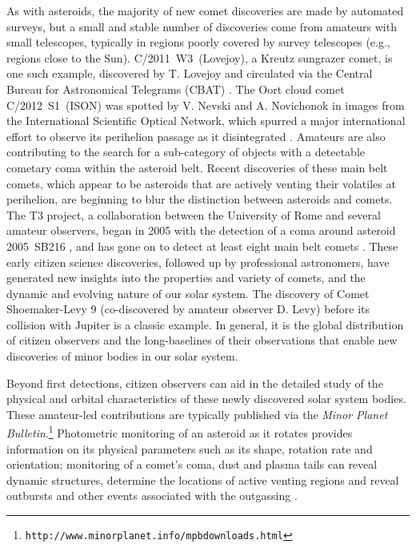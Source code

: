 \documentclass{ar2e}
\def\url#1{\texttt{#1}}
\begin{document}
As with asteroids, the majority of new comet discoveries are made by automated
surveys, but a small and stable number of discoveries come from amateurs with
small telescopes, typically in regions poorly covered by survey telescopes
(e.g., regions close to the Sun).   C/2011~W3~(Lovejoy), a Kreutz sungrazer
comet, is one such example, discovered by T. Lovejoy and circulated via the
Central Bureau for Astronomical Telegrams (CBAT) \citep[e.g.,][]{12sekanina}. 
The Oort cloud comet C/2012~S1~(ISON) was spotted by V. Nevski and A. Novichonok
in images from the International Scientific Optical Network, which spurred a
major international effort to observe its perihelion passage as it disintegrated
\citep{14sekanina}.  Amateurs are also contributing to the search for a
sub-category of objects with a detectable cometary coma within the asteroid
belt.  Recent discoveries of these main belt comets, which appear to be
asteroids that are actively venting their volatiles at perihelion, are beginning
to blur the distinction between asteroids and comets.  The T3 project, a
collaboration between the University of Rome and several amateur observers,
began in 2005 with the detection of a coma around asteroid 2005~SB216
\citep{06buzzi}, and has gone on to detect at least eight main belt comets
\citep{14mousis_proam}.  These early citizen science discoveries, followed up by
professional astronomers, have generated new insights into the properties and
variety of comets, and the dynamic and evolving nature of our solar system.  The
discovery of Comet Shoemaker-Levy 9 (co-discovered by amateur observer D. Levy)
before its collision with Jupiter \citep{04harrington} is a classic example.
In general, it is the global distribution of citizen observers and the
long-baselines of their observations that enable new discoveries of minor bodies
in our solar system.

Beyond first detections, citizen observers can aid in the detailed study of the
physical and orbital characteristics of these newly discovered solar system
bodies. These amateur-led contributions are typically published via the
\textit{Minor Planet
Bulletin}.\footnote{\url{http://www.minorplanet.info/mpbdownloads.html}} 
Photometric monitoring of an asteroid as it rotates provides information on its
physical parameters such as its shape, rotation rate and orientation; 
monitoring of a comet's coma, dust and plasma tails can reveal dynamic
structures, determine the locations of active venting regions and reveal
outbursts and other events associated with the outgassing \citep[see][for a
comprehensive review]{14mousis_proam}.  
\end{document}
